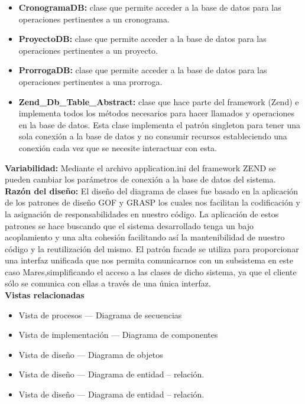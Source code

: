 \documentclass[12pt,oneside,letterpaper]{report}
\begin{document}
\begin{itemize}
 \item \textbf{CronogramaDB:} clase que permite acceder a la base de datos para las operaciones pertinentes a un cronograma.
 \item \textbf{ProyectoDB:} clase que permite acceder a la base de datos para las operaciones pertinentes a un proyecto.
 \item \textbf{ProrrogaDB:} clase que permite acceder a la base de datos para las operaciones pertinentes a una prorroga.
 \item \textbf{Zend\_Db\_Table\_Abstract:} clase que hace parte del framework (Zend) e implementa todos los métodos necesarios para hacer llamados y operaciones en la base de datos. Esta clase implementa el patrón singleton para tener una sola conexión a la base de datos y no consumir recursos estableciendo una conexión cada vez que se necesite interactuar con esta.
\end{itemize}


\textbf{Variabilidad:}
Mediante el archivo application.ini del framework ZEND se pueden cambiar los parámetros de conexión a la base de datos del sistema.\\

\textbf{Razón del diseño:}
El diseño del diagrama de clases fue basado en la aplicación de los patrones  de diseño GOF y GRASP los cuales nos facilitan la codificación y la asignación de responsabilidades en nuestro código. La aplicación de estos patrones se hace buscando que el sistema desarrollado tenga un bajo acoplamiento y una alta cohesión facilitando así la mantenibilidad de nuestro código y la reutilización del mismo.
El patrón facade se utiliza para proporcionar una interfaz unificada que nos permita comunicarnos con un subsistema en este caso Mares,simplificando el acceso a las clases de dicho sistema, ya que el cliente sólo se comunica con ellas a través de una única interfaz.\\

\textbf{Vistas relacionadas}
\begin{itemize}
\item Vista de procesos --- Diagrama de secuencias
\item Vista de implementación --- Diagrama de componentes
\item Vista de diseño --- Diagrama de objetos
\item Vista de diseño --- Diagrama de entidad – relación.
\item Vista de diseño --- Diagrama de entidad – relación.
\end{itemize}
\end{document}
